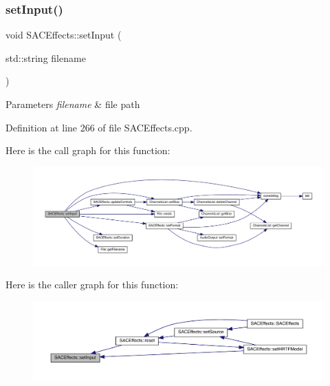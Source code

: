 \subsubsection{\texorpdfstring{set\+Input()}{setInput()}}
{\footnotesize\ttfamily void S\+A\+C\+Effects\+::set\+Input (\begin{DoxyParamCaption}\item[{std\+::string}]{filename }\end{DoxyParamCaption})}


\begin{DoxyParams}{Parameters}
{\em filename} & file path \\
\hline
\end{DoxyParams}


Definition at line 266 of file S\+A\+C\+Effects.\+cpp.

Here is the call graph for this function\+:
\nopagebreak
\begin{figure}[H]
\begin{center}
\leavevmode
\includegraphics[width=350pt]{class_s_a_c_effects_a5292df44aee2a4ec49c99e3136b5472e_cgraph}
\end{center}
\end{figure}
Here is the caller graph for this function\+:
\nopagebreak
\begin{figure}[H]
\begin{center}
\leavevmode
\includegraphics[width=350pt]{class_s_a_c_effects_a5292df44aee2a4ec49c99e3136b5472e_icgraph}
\end{center}
\end{figure}
\mbox{\label{class_s_a_c_effects_aaa9092eb132a8fe2b0560b3a600747b5}} 
